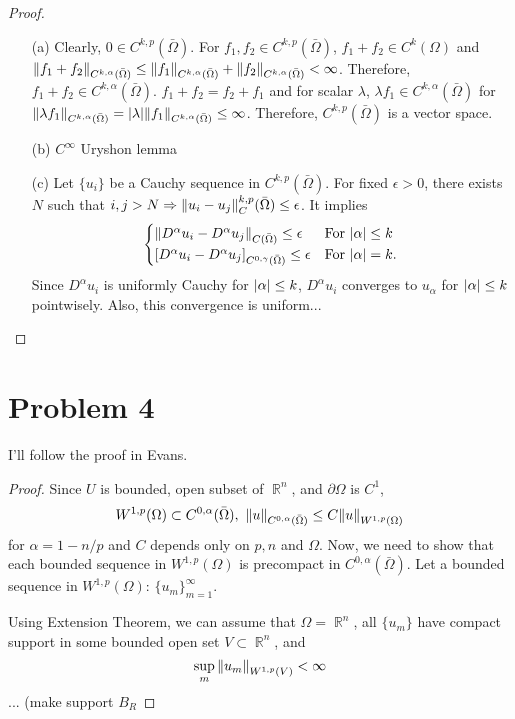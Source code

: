 \documentclass{article}
\DeclareMathOperator{\rr}{\mathbb{R}}
\begin{document}
\begin{proof}
\begin{enumerate}
\item[(a)] Clearly, $0\in C^{k,p}(\bar{\Omega})$. For $f_1, f_2\in C^{k,p}(\bar{\Omega})$, $f_1+f_2\in C^k(\Omega)$ and $\norm{f_1+f_2}_{C^{k,\alpha}(\bar{\Omega})}\leq \norm{f_1}_{C^{k,\alpha}(\bar{\Omega})}+\norm{f_2}_{C^{k,\alpha}(\bar{\Omega})}< \infty$. Therefore, $f_1+f_2\in {C^{k,\alpha}(\bar{\Omega})}$. $f_1+f_2=f_2+f_1$ and for scalar $\lambda$, $\lambda f_1\in {C^{k,\alpha}(\bar{\Omega})}$ for $\norm{\lambda f_1}_{C^{k,\alpha}(\bar{\Omega})}=\abs{\lambda}\norm{f_1}_{C^{k,\alpha}(\bar{\Omega})}\leq \infty$. Therefore, $C^{k,p}(\bar{\Omega})$ is a vector space.
\item[(b)] $C^\infty $ Uryshon lemma
\item[(c)] Let $\{u_i\}$ be a Cauchy sequence in $C^{k,p}(\bar{\Omega})$. For fixed $\epsilon>0$, there exists $N$ such that $i,j>N\Rightarrow \norm{u_i-u_j}_C^{k,p}(\bar{\Omega})\leq \epsilon$. It implies
\begin{equation*}
\begin{cases}
\norm{D^\alpha u_i-D^\alpha u_j}_{C(\bar{\Omega})}\leq \epsilon & \text{For }\abs{\alpha}\leq k \\
\left[D^\alpha u_i-D^\alpha u_j\right]_{C^{0,\gamma}(\bar{\Omega})}\leq \epsilon & \text{For }\abs{\alpha}=k.
\end{cases}
\end{equation*}
Since $D^\alpha u_i$ is uniformly Cauchy for $\abs{\alpha}\leq k$, $D^\alpha u_i$ converges to $u_\alpha$ for $\abs{\alpha}\leq k$ pointwisely. Also, this convergence is uniform...
\end{enumerate}
\end{proof}
\section*{Problem 4}
I'll follow the proof in Evans.
\begin{proof}
Since $U$ is bounded, open subset of $\rr^n$, and $\partial \Omega$ is $C^1$,
\begin{equation*}
W^{1,p}(\Omega)\subset C^{0, \alpha}(\bar{\Omega}),~\norm{u}_{C^{0, \alpha}(\bar{\Omega})}\leq C\norm{u}_{W^{1,p}(\Omega)}
\end{equation*}
for $\alpha=1-n/p$ and $C$ depends only on $p,n$ and $\Omega$. Now, we need to show that each bounded sequence in $W^{1,p}(\Omega)$ is precompact in $C^{0, \alpha}(\bar{\Omega})$. Let a bounded sequence in $W^{1,p}(\Omega)$: $\{u_m\}_{m=1}^\infty$.

Using Extension Theorem, we can assume that $\Omega=\rr^n$, all $\{u_m\}$ have compact support in some bounded open set $V\subset \rr^n$, and
\begin{equation*}
\sup\limits_m \norm{u_m}_{W^{1,p}(V)}<\infty
\end{equation*}
... (make support $B_R$
\end{proof}
\end{document}
